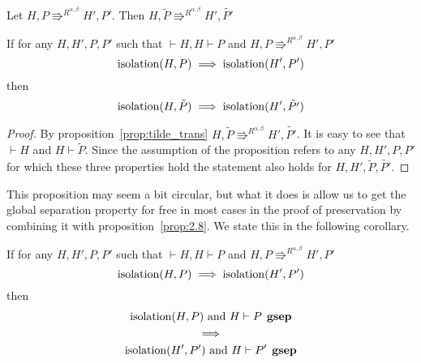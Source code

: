 \begin{proposition} \label{prop:tilde_trans}
  Let $H, P \Rrightarrow^{R^{\alpha, \beta}} H', P'$. Then $H, \tilde{P}
  \Rrightarrow^{R^{\alpha, \beta}} H', \tilde{P'}$
\end{proposition}

\begin{proposition} \label{prop:2.9}
  If for any $H, H', P, P'$ such that $\vdash H, H \vdash P$ and $H, P
  \Rrightarrow^{R^{\alpha, \beta}} H', P'$
  \begin{equation*}
      \mbox{$\mathrm{isolation}$}(H, P) 
      \implies 
      \mbox{$\mathrm{isolation}$}(H', P')
  \end{equation*}
  then
  \begin{equation*}
    \mbox{$\mathrm{isolation}$}(H, \tilde{P}) \implies \mbox{$\mathrm{isolation}$}(H', \tilde{P'})
  \end{equation*}
\end{proposition}

\begin{proof}
  By proposition~\ref{prop:tilde_trans} $H, \tilde{P} \Rrightarrow^{R^{\alpha,
  \beta}} H', \tilde{P'}$. It is easy to see that $\vdash H$ and $H \vdash
  \tilde{P}$.
  Since the assumption of the proposition refers to any $H, H', P, P'$ for which
  these three properties hold the statement also holds for $H, H',
  \tilde{P}, \tilde{P'}$.
\end{proof}

\begin{remark}
  This proposition may seem a bit circular, but what it does is allow us to get
  the global separation property for free in most cases in the proof of
  preservation by combining it with proposition~\ref{prop:2.8}. We state
  this in the following corollary.
\end{remark}

\begin{corollary} \label{cor:2.9}
  If for any $H, H', P, P'$ such that $\vdash H, H \vdash P$ and $H, P
  \Rrightarrow^{R^{\alpha, \beta}} H', P'$
  \begin{equation*}
      \mbox{$\mathrm{isolation}$}(H, P) 
      \implies 
      \mbox{$\mathrm{isolation}$}(H', P')
  \end{equation*}
  then
  \begin{equation*}
    \begin{gathered}
      \mbox{$\mathrm{isolation}$}(H, P) \text{ and } H \vdash P \:\: \mbox{\bf gsep} \\
      \implies \\
      \mbox{$\mathrm{isolation}$}(H', P') \text{ and } H \vdash P' \:\: \mbox{\bf gsep}
    \end{gathered}
  \end{equation*}
\end{corollary}

